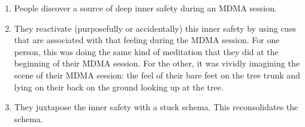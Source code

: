 \documentclass[11pt,oneside]{book}
\begin{document}
\begin{itemize}
	\begin{enumerate}
        \item People discover a source of deep inner safety during an MDMA session.
        \item They reactivate (purposefully or accidentally) this inner safety by using cues that are associated with that feeling during the MDMA session. For one person, this was doing the same kind of meditation that they did at the beginning of their MDMA session. For the other, it was vividly imagining the scene of their MDMA session: the feel of their bare feet on the tree trunk and lying on their back on the ground looking up at the tree.
        \item They juxtapose the inner safety with a stuck schema. This reconsolidates the schema.
    \end{enumerate}
\end{itemize}
\end{document}
